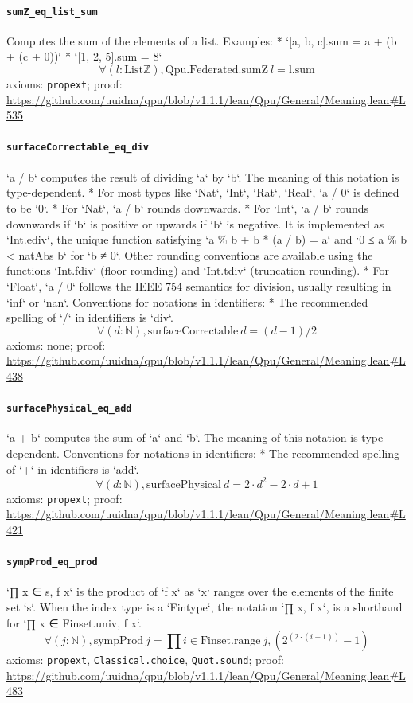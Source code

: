 \documentclass[11pt]{article}
\begin{document}
\paragraph{\texttt{sumZ\_eq\_list\_sum}}
Computes the sum of the elements of a list.  Examples: * `[a, b, c].sum = a + (b + (c + 0))` * `[1, 2, 5].sum = 8`
\[ \forall (l : \mathrm{List} \mathbb{Z}), \mathrm{Qpu.Federated.sumZ}\ l = \mathrm{l.sum} \]
\noindent axioms: \texttt{propext}; proof: \url{https://github.com/uuidna/qpu/blob/v1.1.1/lean/Qpu/General/Meaning.lean\#L535}

\paragraph{\texttt{surfaceCorrectable\_eq\_div}}
`a / b` computes the result of dividing `a` by `b`. The meaning of this notation is type-dependent. * For most types like `Nat`, `Int`, `Rat`, `Real`, `a / 0` is defined to be `0`. * For `Nat`, `a / b` rounds downwards. * For `Int`, `a / b` rounds downwards if `b` is positive or upwards if `b` is negative.   It is implemented as `Int.ediv`, the unique function satisfying   `a \% b + b * (a / b) = a` and `0 ≤ a \% b < natAbs b` for `b ≠ 0`.   Other rounding conventions are available using the functions   `Int.fdiv` (floor rounding) and `Int.tdiv` (truncation rounding). * For `Float`, `a / 0` follows the IEEE 754 semantics for division,   usually resulting in `inf` or `nan`.   Conventions for notations in identifiers:   * The recommended spelling of `/` in identifiers is `div`.
\[ \forall (d : \mathbb{N}), \mathrm{surfaceCorrectable}\ d = (d - 1) / 2 \]
\noindent axioms: none; proof: \url{https://github.com/uuidna/qpu/blob/v1.1.1/lean/Qpu/General/Meaning.lean\#L438}

\paragraph{\texttt{surfacePhysical\_eq\_add}}
`a + b` computes the sum of `a` and `b`. The meaning of this notation is type-dependent.   Conventions for notations in identifiers:   * The recommended spelling of `+` in identifiers is `add`.
\[ \forall (d : \mathbb{N}), \mathrm{surfacePhysical}\ d = 2 \cdot d ^{2} - 2 \cdot d + 1 \]
\noindent axioms: \texttt{propext}; proof: \url{https://github.com/uuidna/qpu/blob/v1.1.1/lean/Qpu/General/Meaning.lean\#L421}

\paragraph{\texttt{sympProd\_eq\_prod}}
`∏ x ∈ s, f x` is the product of `f x` as `x` ranges over the elements of the finite set `s`.  When the index type is a `Fintype`, the notation `∏ x, f x`, is a shorthand for `∏ x ∈ Finset.univ, f x`.
\[ \forall (j : \mathbb{N}), \mathrm{sympProd}\ j = \prod i \in \mathrm{Finset.range}\ j, (2 ^{(2 \cdot (i + 1))} - 1) \]
\noindent axioms: \texttt{propext}, \texttt{Classical.choice}, \texttt{Quot.sound}; proof: \url{https://github.com/uuidna/qpu/blob/v1.1.1/lean/Qpu/General/Meaning.lean\#L483}
\end{document}
